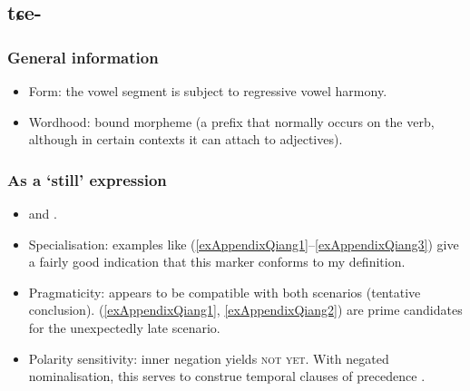 \subsection{tɕe-}

\subsubsection{General information}
\begin{itemize}
	\item Form: the vowel segment is subject to regressive vowel harmony.
	\item Wordhood: bound morpheme (a prefix that normally occurs on the verb, although in certain contexts it can attach to adjectives).
\end{itemize}


\subsubsection{As a \lq{}still\rq{ }expression}
\begin{itemize}
	\item \textcite[169]{LaPollaHuang2003} and \textcite{Huang2005}.
	\item Specialisation: examples like (\ref{exAppendixQiang1}–\ref{exAppendixQiang3}) give a fairly good indication that this marker conforms to my definition.
	\item Pragmaticity: appears to be compatible with both scenarios (tentative conclusion). (\ref{exAppendixQiang1}, \ref{exAppendixQiang2}) are prime candidates for the unexpectedly late scenario.
	\item Polarity sensitivity: inner negation yields \textsc{not yet}. With negated nominalisation, this serves to construe temporal clauses of precedence \parencite[241]{LaPollaHuang2003}.
\end{itemize}
\largerpage[1.5]
